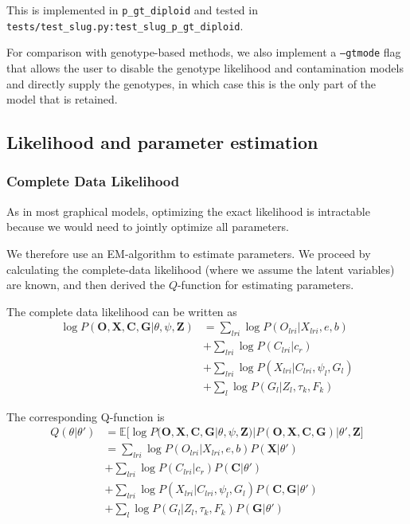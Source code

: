 \documentclass[10pt,a4paper]{article}
\begin{document}
This is implemented in \texttt{p\_gt\_diploid} and tested in \texttt{tests/test\_slug.py:test\_slug\_p\_gt\_diploid}.

For comparison with genotype-based methods, we also implement a \texttt{--gtmode} flag that allows the user to disable  the genotype likelihood and contamination models and directly supply the genotypes, in which case this is the only part of the model that is retained.



\subsection*{Likelihood and parameter estimation}

\subsubsection*{Complete Data Likelihood}
As in most graphical models, optimizing the exact likelihood is intractable because we would need to jointly optimize all parameters. 

We therefore use an EM-algorithm to estimate parameters. We proceed by calculating the complete-data likelihood (where we assume the latent variables) are known, and then derived the $Q$-function for estimating parameters. 

The complete data likelihood can be written as 
\begin{align*}
	\log P(\mathbf{O}, \mathbf{X}, \mathbf{C}, \mathbf{G} | \theta, \psi, \mathbf{Z}) &= 
	\sum_{lri} \log P(O_{lri} | X_{lri}, e, b)\\
	&+ \sum_{lri}\log P(C_{lri} | c_r)\\
	&+ \sum_{lri}\log P(X_{lri} | C_{lri}, \psi_l, G_l)\\
	&+ \sum_{l} \log P( G_l | Z_l, \tau_k, F_k)
\end{align*}

The corresponding Q-function is \begin{align*}
	Q(\theta | \theta') &= \mathbb{E}\big[\log P(\mathbf{O}, \mathbf{X}, \mathbf{C}, \mathbf{G} | \theta, \psi, \mathbf{Z}) | P(\mathbf{O, X, C, G}) | \theta', \mathbf{Z} \big]\\ &= 
	\sum_{lri} \log P(O_{lri} | X_{lri}, e, b) P(\mathbf{X} | \theta')\\
	&+ \sum_{lri}\log P(C_{lri} | c_r) P(\mathbf{C} | \theta')\\
	&+ \sum_{lri}\log P(X_{lri} | C_{lri}, \psi_l, G_l)P(\mathbf{C,G} | \theta')\\
	&+ \sum_{l} \log P( G_l | Z_l, \tau_k, F_k) P(\mathbf{G} | \theta')
\end{align*}
\end{document}
